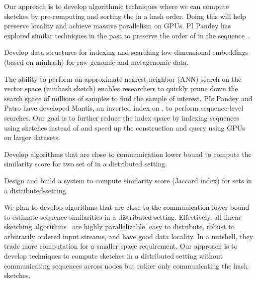 Our approach is to develop algorithmic techniques where we can compute sketches by pre-computing and sorting the \kmers in a hash order. Doing this will help preserve locality and achieve massive parallelism on GPUs. PI Pandey has explored similar techniques in the past to preserve the order of \kmers in the sequence~\cite{Marais2019}.

\begin{rproblem}
Develop data structures for indexing and searching low-dimensional embeddings (based on minhash) for raw genomic and metagenomic data.
\end{rproblem}

The ability to perform an approximate nearest neighbor (ANN) search on the vector space (minhash sketch) enables researchers to quickly prune down the search space of millions of samples to find the sample of interest. PIs Pandey and Patro have developed Mantis, an inverted index on \kmers, to perform sequence-level searches. Our goal is to further reduce the index space by indexing sequences using sketches instead of \kmers and speed up the construction and query using GPUs on larger datasets.

\begin{rproblem}
Develop algorithms that are close to communication lower bound to compute the similarity score for two set of \kmers in a distributed setting.
\end{rproblem}

\begin{rproblem}
Design and build a system to compute similarity score (Jaccard index) for \kmer sets in a distributed-setting.
\end{rproblem}

We plan to develop algorithms that are close to the communication lower bound to estimate sequence similarities in a distributed setting. Effectively, all linear sketching algorithms~\cite{li2014sketchuniversal} are highly parallelizable, easy to distribute, robust to arbitrarily ordered input streams, and have good data locality. In a nutshell, they trade more computation for a smaller space requirement. Our approach is to develop techniques to compute sketches in a distributed setting without communicating sequences across nodes but rather only communicating the hash sketches.

